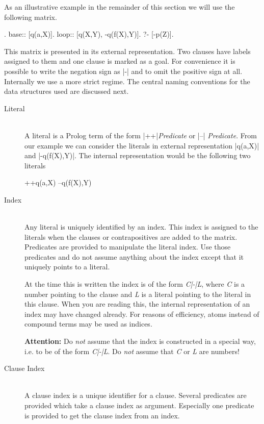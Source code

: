 As an illustrative example in the remainder of this section we will use the
following matrix.
\begin{BoxedSample}
       [p(X), -q(f(X),g(X))].
base:: [q(a,X)].
loop:: [q(X,Y), -q(f(X),Y)].
?-     [-p(Z)].
\end{BoxedSample}
This matrix is presented in its external representation. Two clauses have labels
assigned to them and one clause is marked as a goal. For convenience it is
possible to write the negation sign as |-| and to omit the positive sign at all.
Internally we use a more strict regime. The central naming conventions for the
data structures used are discussed next.

\begin{description}
\item[Literal] \ \\
  A literal is a Prolog term of the form |++|{\em Predicate}\/ or |--|{\em
    Predicate}. From our example we can consider the literals in external
  representation |q(a,X)| and |-q(f(X),Y)|. The internal representation would
  be the following two literals
\begin{BoxedSample}
    ++q(a,X)
    --q(f(X),Y)
\end{BoxedSample}

\item[Index]\ \\
  Any literal is uniquely identified by an index. This index is assigned to
  the literals when the clauses or contrapositives are added to the matrix.
  Predicates are provided to manipulate the literal index. Use those
  predicates and do not assume anything about the index except that it
  uniquely points to a literal.

  At the time this is written the index is of the form {\em C|-|L}, where
  {\em C}\/ is a number pointing to the clause and {\em L}\/ is a literal
  pointing to the literal in this clause. When you are reading this, the
  internal representation of an index may have changed already. For reasons of
  efficiency, atoms instead of compound terms may be used as indices.
  
  {\large\bf Attention:} Do {\em not}\/ assume that the index is constructed in
  a special way, i.e. to be of the form {\em C|-|L}. Do {\em not}\/ assume
  that {\em C}\/ or {\em L}\/ are numbers!

\item[Clause Index]\ \\
  A clause index is a unique identifier for a clause. Several predicates are
  provided which take a clause index as argument. Especially one predicate is
  provided to get the clause index from an index.


\end{description}
